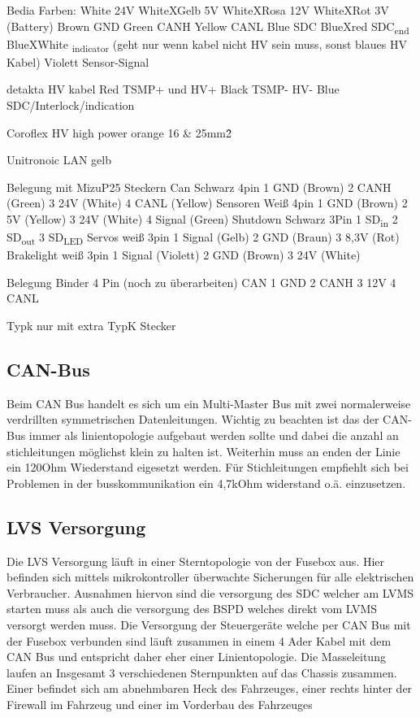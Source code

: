 Bedia Farben:
White 24V
WhiteXGelb 5V
WhiteXRosa 12V
WhiteXRot 3V (Battery)
Brown GND
Green CANH
Yellow CANL
Blue SDC
BlueXred SDC\textsubscript{end}
BlueXWhite \textsubscript{indicator} (geht nur wenn kabel nicht HV sein muss, sonst blaues HV Kabel)
Violett Sensor-Signal

detakta HV kabel
Red TSMP+ und HV+
Black TSMP- HV-
Blue SDC/Interlock/indication

Coroflex 
HV high power orange
16 \& 25mm\^2

Unitronoic LAN
gelb

Belegung mit MizuP25 Steckern
Can Schwarz 4pin
1 GND (Brown)
2 CANH (Green)
3 24V (White)
4 CANL (Yellow)
Sensoren Weiß 4pin 
1 GND (Brown)
2 5V (Yellow)
3 24V (White)
4 Signal (Green)
Shutdown Schwarz 3Pin
1 SD\textsubscript{in}
2 SD\textsubscript{out}
3 SD\textsubscript{LED}
Servos weiß 3pin
1 Signal (Gelb)
2 GND (Braun)
3 8,3V (Rot)
Brakelight weiß 3pin
1 Signal (Violett)
2 GND (Brown)
3 24V (White)

Belegung Binder 4 Pin (noch zu überarbeiten)
CAN
1 GND
2 CANH
3 12V
4 CANL

Typk nur mit extra TypK Stecker

\subsection{CAN-Bus}
Beim CAN Bus handelt es sich um ein Multi-Master Bus mit zwei normalerweise verdrillten symmetrischen Datenleitungen. Wichtig zu beachten ist das der CAN-Bus immer als linientopologie aufgebaut werden sollte und dabei die anzahl an stichleitungen möglichst klein zu halten ist. Weiterhin muss an enden der Linie ein 120Ohm Wiederstand eigesetzt werden. Für Stichleitungen empfiehlt sich bei Problemen in der busskommunikation ein 4,7kOhm widerstand o.ä. einzusetzen.

\subsection{LVS Versorgung}

Die LVS Versorgung läuft in einer Sterntopologie von der Fusebox aus. Hier befinden sich mittels mikrokontroller überwachte Sicherungen für alle elektrischen Verbraucher. Ausnahmen hiervon sind die versorgung des SDC welcher am LVMS starten muss als auch die versorgung des BSPD welches direkt vom LVMS versorgt werden muss. Die Versorgung der Steuergeräte welche per CAN Bus mit der Fusebox verbunden sind läuft zusammen in einem 4 Ader Kabel mit dem CAN Bus und entspricht daher eher einer Linientopologie. Die Masseleitung laufen an Insgesamt 3 verschiedenen Sternpunkten auf das Chassis zusammen. Einer befindet sich am abnehmbaren Heck des Fahrzeuges, einer rechts hinter der Firewall im Fahrzeug und einer im Vorderbau des Fahrzeuges

